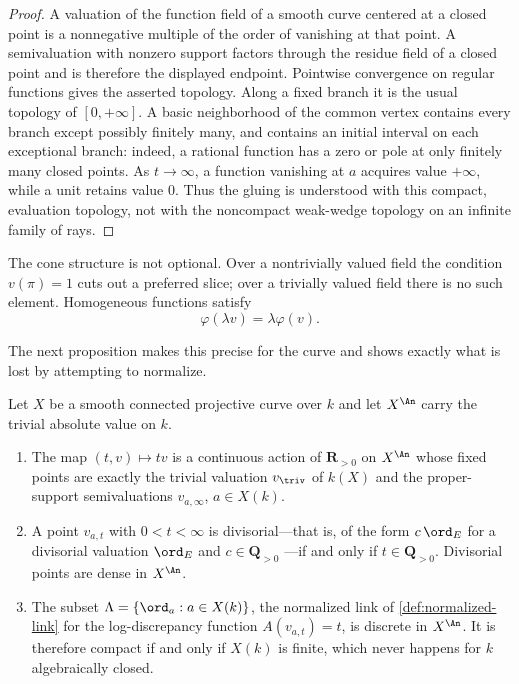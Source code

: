 \begin{proof}
A valuation of the function field of a smooth curve centered at a closed
point is a nonnegative multiple of the order of vanishing at that point.
A semivaluation with nonzero support factors through the residue field of a
closed point and is therefore the displayed endpoint.  Pointwise convergence
on regular functions gives the asserted topology.  Along a fixed branch it
is the usual topology of $[0,+\infty]$.  A basic neighborhood of the common
vertex contains every branch except possibly finitely many, and contains an
initial interval on each exceptional branch: indeed, a rational function has
a zero or pole at only finitely many closed points.  As $t\to\infty$, a
function vanishing at $a$ acquires value $+\infty$, while a unit retains value
$0$.  Thus the gluing is understood with this compact, evaluation topology,
not with the noncompact weak-wedge topology on an infinite family of rays.
\end{proof}

The cone structure is not optional.  Over a nontrivially valued field the
condition $v(\pi)=1$ cuts out a preferred slice; over a trivially valued field
there is no such element.  Homogeneous functions satisfy
\[
                              \varphi(\lambda v)=\lambda\varphi(v).
\]

The next proposition makes this precise for the curve and shows exactly what
is lost by attempting to normalize.

\begin{proposition}
\label{prop:ch08-trivial-curve-scaling}
Let $X$ be a smooth connected projective curve over $k$ and let
$X^{\An}$ carry the trivial absolute value on $k$.
\begin{enumerate}
\item The map $(t,v)\mapsto tv$ is a continuous action of
$\mathbf R_{>0}$ on $X^{\An}$ whose fixed points are exactly the trivial
valuation $v_\triv$ of $k(X)$ and the proper-support semivaluations
$v_{a,\infty}$, $a\in X(k)$.
\item A point $v_{a,t}$ with $0<t<\infty$ is divisorial---that is, of the
form $c\,\ord_E$ for a divisorial valuation $\ord_E$ and $c\in\mathbf Q_{>0}$
---if and only if $t\in\mathbf Q_{>0}$.  Divisorial points are dense in
$X^{\An}$.
\item The subset $\Lambda=\{\ord_a:a\in X(k)\}$, the normalized link of
\cref{def:normalized-link} for the log-discrepancy function
$A(v_{a,t})=t$, is discrete in $X^{\An}$.  It is therefore compact if and
only if $X(k)$ is finite, which never happens for $k$ algebraically closed.
\end{enumerate}
\end{proposition}

